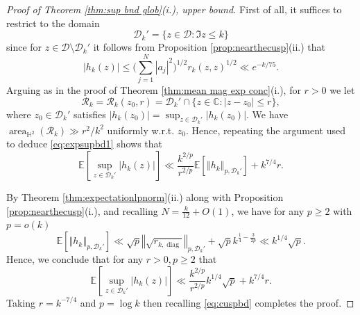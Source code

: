 \documentclass[12pt, a4paper]{amsart}
\newcommand{\tmop}[1]{\ensuremath{\operatorname{#1}}}
\theoremstyle{definition}
\newcommand {\1} {\mathbf{1}}
\newcommand {\Dc} {\mathcal{D}}
\numberwithin{equation}{section}
\begin{document}
\begin{proof}[Proof of Theorem \ref{thm:sup bnd glob}(i.), upper bound]
First of all, it suffices to restrict to the domain \[\Dc_k'=\{z \in \Dc: \Im z \le k\}\] since for $z \in \Dc \setminus \Dc_k'$ it follows from Proposition \ref{prop:nearthecusp}(ii.) that
\begin{equation}\label{eq:cuspbd}
|h_k(z)| \le \bigg( \sum_{j=1}^N |a_j|^2 \bigg)^{1/2}  r_k(z,z)^{1/2} \ll e^{-k/75}.
\end{equation}
Arguing as in the proof of Theorem \ref{thm:mean mag exp conc}(i.), for $r>0$ we let
\[
\mathcal R_k=\mathcal R_k(z_0,r)=\Dc_k' \cap \{ z \in \mathbb C :
|z-z_0|\le r\},
\]
where $z_0 \in \mathcal D_k'$ satisfies $|h_k(z_0)|=\sup_{z\in \Dc_k'} |h_k(z_0)|$. We have $\tmop{area}_{\mathbb H^2}
(\mathcal R_k) \gg r^2/k^2$ uniformly w.r.t. $z_0$. Hence, repeating the argument used to deduce \eqref{eq:expsupbd1} shows that
\[
\mathbb E\left[\sup_{z\in  \Dc_k'} |h_k(z)|\right]  \ll  \frac{k^{2/p}}{r^{2/p}} \mathbb E \left[\left\Vert
h_k \right\Vert_{p,\Dc_k'}\right]+k^{7/4}r.
\]

By Theorem \ref{thm:expectationlpnorm}(ii.) along with Proposition \ref{prop:nearthecusp}(i.), and recalling $N=\frac{k}{12}+O(1)$, we have for any $p \ge 2$ with $p=o(k)$
\[
\mathbb{E}\left[\left\Vert h_{k}\right\Vert _{p,\Dc_k'}\right] \ll \sqrt{p} \left\Vert \sqrt {r_{k,\tmop{diag}}}\right\Vert_{p,\Dc_k'}+ \sqrt{p}k^{\frac14-\frac{3}{2p}} \ll k^{1/4} \sqrt{p}.
\]
Hence, we conclude that for any $r>0,p\ge 2$ that 
\[
\mathbb E\left[\sup_{z\in  \Dc_k'} |h_k(z)|\right]  \ll  \frac{k^{2/p}}{r^{2/p}} k^{1/4}\sqrt{p}+k^{7/4}r.
\]
Taking $r=k^{-7/4}$ and $p=\log k$ then recalling \eqref{eq:cuspbd} completes the proof.
\end{proof}
\end{document}
